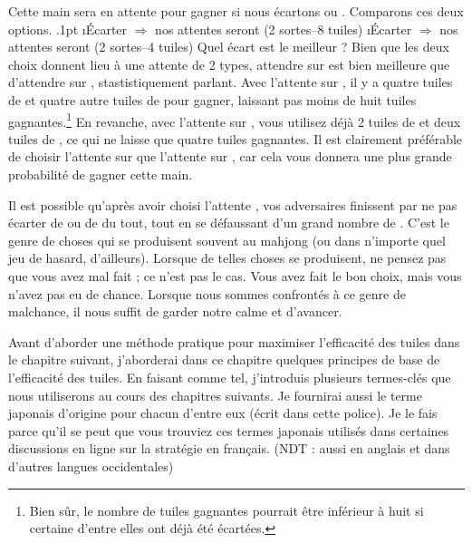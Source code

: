 \bigskip
\noindent
Cette main sera en attente pour gagner si nous écartons {\LARGE{}} ou {\LARGE{}}. Comparons ces deux options.
\bi\itemsep.1pt
\i Écarter {\LARGE{}} \hfill $\Rightarrow$ nos attentes seront {\LARGE{} } (2 sortes--8 tuiles)
\i Écarter {\LARGE{}} \hfill $\Rightarrow$ nos attentes seront {\LARGE{}} {\LARGE{}} (2 sortes--4 tuiles)
\ei
Quel écart est le meilleur ? Bien que les deux choix donnent lieu à une attente de 2 types, attendre sur {\LARGE{} } est bien meilleure que d'attendre sur {\LARGE{}} {\LARGE{}}, stastistiquement parlant. Avec l'attente sur {\LARGE{} }, il y a quatre tuiles de {\LARGE{}} et quatre autre tuiles de {\LARGE{}} pour gagner, laissant pas moins de huit tuiles gagnantes.\footnote{Bien sûr, le nombre de tuiles gagnantes pourrait être inférieur à huit si certaine d'entre elles ont déjà été écartées.} 
En revanche, avec l'attente sur {\LARGE{}} {\LARGE{}}, vous utilisez déjà 2 tuiles de {\LARGE{}} et deux tuiles de {\LARGE{}}, ce qui ne laisse que quatre tuiles gagnantes. Il est clairement préférable de choisir l'attente sur {\LARGE{} } que l'attente sur {\LARGE{}} {\LARGE{}}, car cela vous donnera une plus grande probabilité de gagner cette main. 

\bigskip
Il est possible qu'après avoir choisi l'attente {\LARGE{} }, vos adversaires finissent par ne pas écarter de {\LARGE{}} ou de {\LARGE{}} du tout, tout en se défaussant d'un grand nombre de {\LARGE{} }. C'est le genre de choses qui se produisent souvent au mahjong (ou dans n'importe quel jeu de hasard, d'ailleurs). Lorsque de telles choses se produisent, ne pensez pas que vous avez mal fait ; ce n'est pas le cas. Vous avez fait le bon choix, mais vous n'avez pas eu de chance. Lorsque nous sommes confrontés à ce genre de malchance, il nous suffit de garder notre calme et d'avancer. 

\bigskip
Avant d'aborder une méthode pratique pour maximiser l'efficacité des tuiles dans le chapitre suivant, j'aborderai dans ce chapitre quelques principes de base de l'efficacité des tuiles. En faisant comme tel, j'introduis plusieurs termes-clés que nous utiliserons au cours des chapitres suivants. Je fournirai aussi le terme japonais d'origine pour chacun d'entre eux (écrit dans {\jap cette police}). Je le fais parce qu'il se peut que vous trouviez ces termes japonais utilisés dans certaines discussions en ligne sur la stratégie en français. (NDT : aussi en anglais et dans d'autres langues occidentales)

